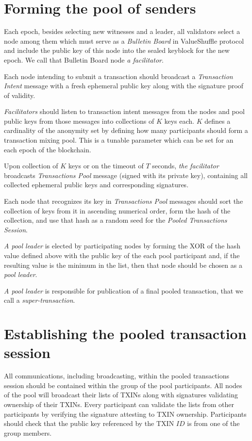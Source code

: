 \documentclass[8pt,fleqn,openany]{book}
\begin{document}
\section{Forming the pool of senders}
Each epoch, besides selecting new witnesses and a leader, all validators select a node among them which must serve as a \textit{Bulletin Board} in ValueShuffle protocol and include the public key of this node into the sealed keyblock for the new epoch. We call that Bulletin Board node \textit{a facilitator}.

Each node intending to submit a transaction should broadcast a \textit{Transaction Intent} message with a fresh ephemeral public key along with the signature proof of validity.

\textit{Facilitators} should listen to transaction intent messages from the nodes and pool public keys from those messages into collections of $K$ keys each. $K$ defines a cardinality of the anonymity set by defining how many participants should form a transaction mixing pool. This is a tunable parameter which can be set for an each epoch of the blockchain. 

Upon collection of $K$ keys or on the timeout of $T$ seconds, \textit{the facilitator} broadcasts \textit{Transactions Pool} message (signed with its private key), containing all collected ephemeral public keys and corresponding signatures.

Each node that recognizes its key in \textit{Transactions Pool} messages should sort the collection of keys from it in ascending numerical order, form the hash of the collection, and use that hash as a random seed for the \textit{Pooled Transactions Session}.

\textit{A pool leader} is elected by participating nodes by forming the XOR of the hash value defined above with the public key of the each pool participant and, if the resulting value is the minimum in the list, then that node should be chosen as a \textit{pool leader}.

\textit{A pool leader} is responsible for publication of a final pooled transaction, that we call a \textit{super-transaction}.

\section{Establishing the pooled transaction session}
All communications, including broadcasting, within the pooled transactions session should be contained within the group of the pool participants. All nodes of the pool will broadcast their lists of TXINs along with signatures validating ownership of their TXINs. Every participant can validate the lists from other participants by verifying the signature attesting to TXIN ownership. Participants should check that the public key referenced by the TXIN $ID$ is from one of the group members.
\end{document}
